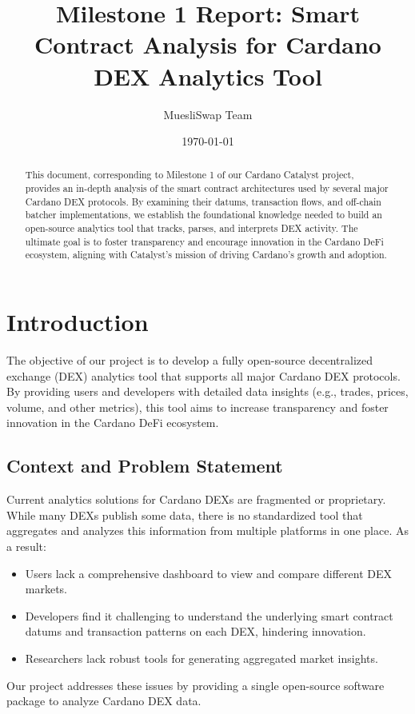 \documentclass{article}
\title{\textbf{Milestone 1 Report: Smart Contract Analysis for Cardano DEX Analytics Tool}}
\author{MuesliSwap Team}
\date{\today}
\begin{document}
\maketitle

\begin{abstract}
This document, corresponding to Milestone 1 of our Cardano Catalyst project, provides an in-depth analysis of the smart contract architectures used by several major Cardano DEX protocols. By examining their datums, transaction flows, and off-chain batcher implementations, we establish the foundational knowledge needed to build an open-source analytics tool that tracks, parses, and interprets DEX activity. The ultimate goal is to foster transparency and encourage innovation in the Cardano DeFi ecosystem, aligning with Catalyst’s mission of driving Cardano’s growth and adoption.
\end{abstract}

\vfill
\tableofcontents
\newpage

\section{Introduction}
\label{sec:intro}
The objective of our project is to develop a fully open-source decentralized exchange (DEX) analytics tool that supports all major Cardano DEX protocols. By providing users and developers with detailed data insights (e.g., trades, prices, volume, and other metrics), this tool aims to increase transparency and foster innovation in the Cardano DeFi ecosystem.

\subsection{Context and Problem Statement}
Current analytics solutions for Cardano DEXs are fragmented or proprietary. While many DEXs publish some data, there is no standardized tool that aggregates and analyzes this information from multiple platforms in one place. As a result:
\begin{itemize}
    \item Users lack a comprehensive dashboard to view and compare different DEX markets.
    \item Developers find it challenging to understand the underlying smart contract datums and transaction patterns on each DEX, hindering innovation.
    \item Researchers lack robust tools for generating aggregated market insights.
\end{itemize}
Our project addresses these issues by providing a single open-source software package to analyze Cardano DEX data.
\end{document}

